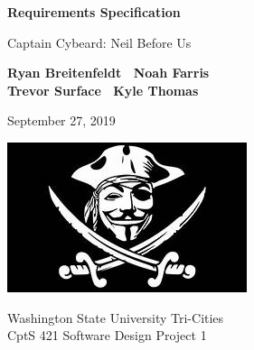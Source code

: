 \begin{titlepage}
    \begin{center}
        \vspace*{1cm}

        \Huge
        \textbf{Requirements Specification}

        \vspace{.5cm}
        \LARGE
        Captain Cybeard: Neil Before Us

        \vspace{1cm}

        \textbf{Ryan Breitenfeldt \textbar\ Noah Farris\\ Trevor Surface \textbar\ Kyle Thomas}

        \vspace{.2cm}
        \Large
        September 27, 2019

        \vspace{2cm}
        \includegraphics[scale=1]{logo}

        \vfill

        Washington State University Tri-Cities\\
        CptS 421 Software Design Project 1

    \end{center}
\end{titlepage}

